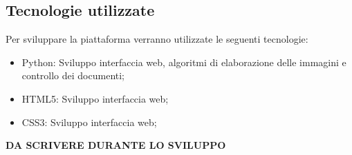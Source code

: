 \subsection{Tecnologie utilizzate}
Per sviluppare la piattaforma verranno utilizzate le seguenti tecnologie:
\begin{itemize}
    \item Python: Sviluppo interfaccia web, algoritmi di elaborazione delle immagini e controllo dei documenti;
    \item HTML5: Sviluppo interfaccia web;
    \item CSS3: Sviluppo interfaccia web;
\end{itemize}

\textbf{DA SCRIVERE DURANTE LO SVILUPPO}
